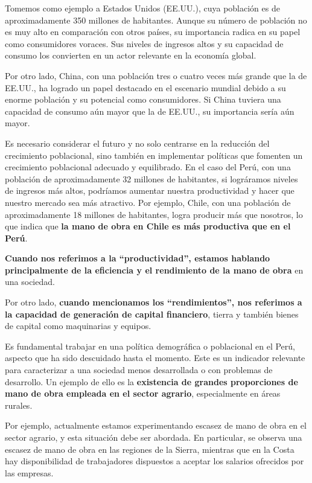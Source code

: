 \documentclass[
  letterpaper,
  DIV=11,
  numbers=noendperiod]{scrartcl}
\begin{document}
Tomemos como ejemplo a Estados Unidos (EE.UU.), cuya población es de
aproximadamente 350 millones de habitantes. Aunque su número de
población no es muy alto en comparación con otros países, su importancia
radica en su papel como consumidores voraces. Sus niveles de ingresos
altos y su capacidad de consumo los convierten en un actor relevante en
la economía global.

Por otro lado, China, con una población tres o cuatro veces más grande
que la de EE.UU., ha logrado un papel destacado en el escenario mundial
debido a su enorme población y su potencial como consumidores. Si China
tuviera una capacidad de consumo aún mayor que la de EE.UU., su
importancia sería aún mayor.

Es necesario considerar el futuro y no solo centrarse en la reducción
del crecimiento poblacional, sino también en implementar políticas que
fomenten un crecimiento poblacional adecuado y equilibrado. En el caso
del Perú, con una población de aproximadamente 32 millones de
habitantes, si lográramos niveles de ingresos más altos, podríamos
aumentar nuestra productividad y hacer que nuestro mercado sea más
atractivo. Por ejemplo, Chile, con una población de aproximadamente 18
millones de habitantes, logra producir más que nosotros, lo que indica
que \textbf{la mano de obra en Chile es más productiva que en el Perú}.

\textbf{Cuando nos referimos a la ``productividad'', estamos hablando
principalmente de la eficiencia y el rendimiento de la mano de obra} en
una sociedad.

Por otro lado, \textbf{cuando mencionamos los ``rendimientos'', nos
referimos a la capacidad de generación de capital financiero}, tierra y
también bienes de capital como maquinarias y equipos.

Es fundamental trabajar en una política demográfica o poblacional en el
Perú, aspecto que ha sido descuidado hasta el momento. Este es un
indicador relevante para caracterizar a una sociedad menos desarrollada
o con problemas de desarrollo. Un ejemplo de ello es la
\textbf{existencia de grandes proporciones de mano de obra empleada en
el sector agrario}, especialmente en áreas rurales.

Por ejemplo, actualmente estamos experimentando escasez de mano de obra
en el sector agrario, y esta situación debe ser abordada. En particular,
se observa una escasez de mano de obra en las regiones de la Sierra,
mientras que en la Costa hay disponibilidad de trabajadores dispuestos a
aceptar los salarios ofrecidos por las empresas.
\end{document}
